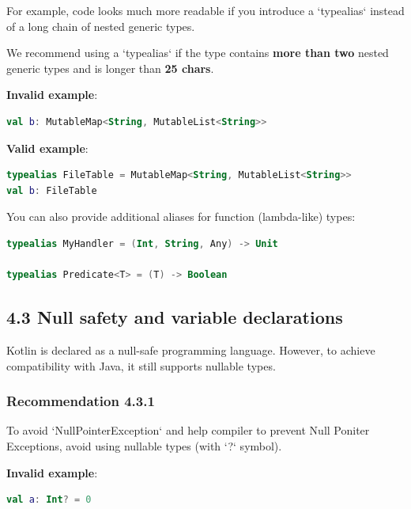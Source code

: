 {{{{For example, code looks much more readable if you introduce a `typealias` instead of a long chain of nested generic types.

We recommend using a `typealias` if the type contains \textbf{more than two} nested generic types and is longer than \textbf{25 chars}.



\textbf{Invalid example}:

\begin{lstlisting}[language=Kotlin]
val b: MutableMap<String, MutableList<String>>
\end{lstlisting}


\textbf{Valid example}:

\begin{lstlisting}[language=Kotlin]
typealias FileTable = MutableMap<String, MutableList<String>>
val b: FileTable
\end{lstlisting}


You can also provide additional aliases for function (lambda-like) types:

\begin{lstlisting}[language=Kotlin]
typealias MyHandler = (Int, String, Any) -> Unit

typealias Predicate<T> = (T) -> Boolean
\end{lstlisting}


\subsection*{\textbf{4.3 Null safety and variable declarations}}

Kotlin is declared as a null-safe programming language. However, to achieve compatibility with Java, it still supports nullable types.



\subsubsection*{\textbf{Recommendation 4.3.1}}
\leavevmode\newline

To avoid `NullPointerException` and help compiler to prevent Null Poniter Exceptions, avoid using nullable types (with `?` symbol).



\textbf{Invalid example}:

\begin{lstlisting}[language=Kotlin]
val a: Int? = 0
\end{lstlisting}


}}}}
